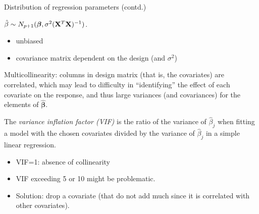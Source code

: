 \documentclass[10pt,ignorenonframetext,]{beamer}
\providecommand{\tightlist}{%
  \setlength{\itemsep}{0pt}\setlength{\parskip}{0pt}}
\begin{document}
\begin{frame}

\begin{block}{Distribution of regression parameters (contd.)}

\(\hat{\beta}\sim N_{p+1}(\boldsymbol{\beta},\sigma^2({\bf X}^T{\bf X})^{-1})\).

\begin{itemize}
\tightlist
\item
  unbiased
\item
  covariance matrix dependent on the design (and \(\sigma^2\))
\end{itemize}

Multicollinearity: columns in design matrix (that is, the covariates)
are correlated, which may lead to difficulty in ``identifying'' the
effect of each covariate on the response, and thus large variances (and
covariances) for the elements of \(\hat{\boldsymbol\beta}\).

The \emph{variance inflation factor (VIF)} is the ratio of the variance
of \(\hat{\beta}_j\) when fitting a model with the chosen covariates
divided by the variance of \(\hat{\beta}_j\) in a simple linear
regression.

\begin{itemize}
\tightlist
\item
  VIF=1: absence of collinearity
\item
  VIF exceeding 5 or 10 might be problematic.
\item
  Solution: drop a covariate (that do not add much since it is
  correlated with other covariates).
\end{itemize}

\end{block}

\end{frame}
\end{document}
